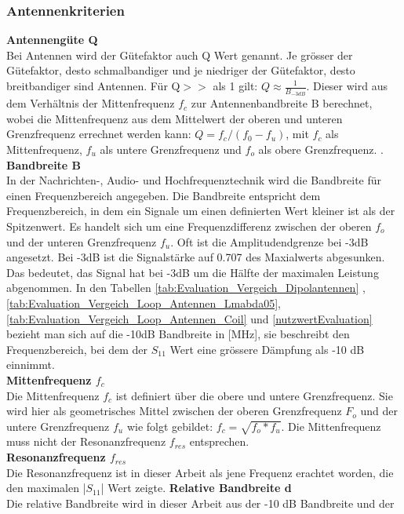 \subsubsection{Antennenkriterien}
\textbf{Antennengüte Q}\\
Bei Antennen wird der Gütefaktor auch Q Wert genannt. Je grösser der Gütefaktor, desto schmalbandiger und je niedriger der Gütefaktor, desto breitbandiger sind Antennen. Für Q$>>$ als 1 gilt: $Q \approx\frac{1}{B_{-3dB}}$. Dieser wird aus dem Verhältnis der Mittenfrequenz $f_{c}$ zur Antennenbandbreite B berechnet, wobei die Mittenfrequenz aus dem Mittelwert der oberen und unteren Grenzfrequenz errechnet werden kann: $Q = f_c/(f_0-f_u)$, mit $f_c$ als Mittenfrequenz, $f_u$ als untere Grenzfrequenz und $f_o$ als obere Grenzfrequenz. \cite{Guetefaktor_Q}.\\
\textbf{Bandbreite B}\\
In der Nachrichten-, Audio- und Hochfrequenztechnik wird die Bandbreite für einen Frequenzbereich angegeben. Die Bandbreite entspricht dem Frequenzbereich, in dem ein Signale um einen definierten Wert kleiner ist als der Spitzenwert. Es handelt sich um eine Frequenzdifferenz zwischen der oberen $f_o$ und der unteren Grenzfrequenz $f_u$. Oft ist die Amplitudendgrenze bei -3dB angesetzt. Bei -3dB ist die Signalstärke auf 0.707 des Maxialwerts abgesunken. Das bedeutet, das Signal hat bei -3dB um die Hälfte der maximalen Leistung abgenommen\cite{Bandbreite_B}.
In den Tabellen \ref{tab:Evaluation_Vergeich_Dipolantennen} ,\ref{tab:Evaluation_Vergeich_Loop_Antennen_Lmabda05}, \ref{tab:Evaluation_Vergeich_Loop_Antennen_Coil} und \ref{nutzwertEvaluation} bezieht man sich auf die -10dB Bandbreite in [MHz], sie beschreibt den Frequenzbereich, bei dem der $S_{11}$ Wert eine grössere Dämpfung als -10 dB einnimmt.\\
\textbf{Mittenfrequenz $f_{c}$}\\
Die Mittenfrequenz $f_c$ ist definiert über die obere und untere Grenzfrequenz. Sie wird hier als geometrisches Mittel zwischen der oberen Grenzfrequenz $F_o$ und der untere Grenzfrequenz $f_u$ wie folgt gebildet: $f_c=\sqrt{f_o*f_u}$. Die Mittenfrequenz muss nicht der Resonanzfrequenz $f_{res}$ entsprechen.\\
\textbf{Resonanzfrequenz $f_{res}$}\\
Die Resonanzfrequenz ist in dieser Arbeit als jene Frequenz erachtet worden, die den maximalen |$S_{11}$| Wert zeigte.
\textbf{Relative Bandbreite d}\\
Die relative Bandbreite wird in dieser Arbeit aus der -10 dB Bandbreite und der  
